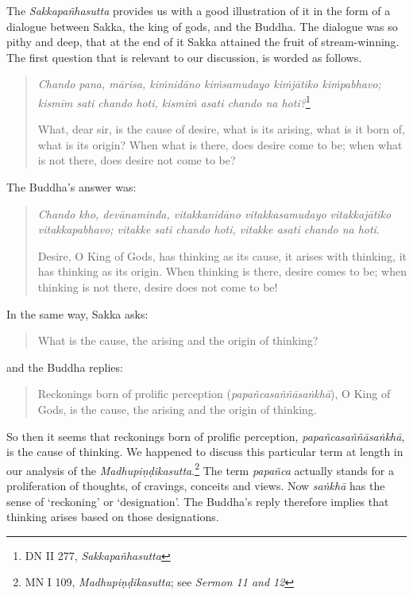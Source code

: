 The \emph{Sakkapañhasutta} provides us with a good illustration of it in the form of a dialogue between Sakka, the king of gods, and the Buddha. The dialogue was so pithy and deep, that at the end of it Sakka attained the fruit of stream-winning. The first question that is relevant to our discussion, is worded as follows.

\begin{quote}
\emph{Chando pana, mārisa, kiṁnidāno kiṁsamudayo kiṁjātiko kiṁpabhavo; kismīm sati chando hoti, kismiṁ asati chando na hoti?}\footnote{DN II 277, \emph{Sakkapañhasutta}}

What, dear sir, is the cause of desire, what is its arising, what is it born of, what is its origin? When what is there, does desire come to be; when what is not there, does desire not come to be?
\end{quote}

The Buddha's answer was:

\begin{quote}
\emph{Chando kho, devānaminda, vitakkanidāno vitakkasamudayo vitakkajātiko vitakkapabhavo; vitakke sati chando hoti, vitakke asati chando na hoti}.

Desire, O King of Gods, has thinking as its cause, it arises with thinking, it has thinking as its origin. When thinking is there, desire comes to be; when thinking is not there, desire does not come to be!
\end{quote}

In the same way, Sakka asks:

\begin{quote}
What is the cause, the arising and the origin of thinking?
\end{quote}

and the Buddha replies:

\begin{quote}
Reckonings born of prolific perception (\emph{papañcasaññāsaṅkhā}), O King of Gods, is the cause, the arising and the origin of thinking.
\end{quote}

So then it seems that reckonings born of prolific perception, \emph{papañcasaññāsaṅkhā}, is the cause of thinking. We happened to discuss this particular term at length in our analysis of the \emph{Madhupiṇḍikasutta}.\footnote{MN I 109, \emph{Madhupiṇḍikasutta}; see \emph{Sermon 11 and 12}} The term \emph{papañca} actually stands for a proliferation of thoughts, of cravings, conceits and views. Now \emph{saṅkhā} has the sense of `reckoning' or `designation'. The Buddha's reply therefore implies that thinking arises based on those designations.

